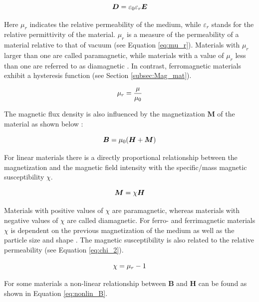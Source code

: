 \begin{equation}
\label{eq:D_tot}
\centering
\boldsymbol{D} = \varepsilon_{0}\varepsilon_{r}\boldsymbol{E}
\end{equation}

Here $\mu_{r}$ indicates the relative permeability of the medium, while $\varepsilon_{r}$ stands for the relative permittivity of the material. $\mu_{r}$ is a measure of the permeability of a material relative to that of vacuum (see Equation \ref{eq:mu_r}). Materials with $\mu_{r}$ larger than one are called paramagnetic, while materials with a value of $\mu_{r}$ less than one are referred to as diamagnetic \cite{svoboda2004magnetic}. In contrast, ferromagnetic materials exhibit a hysteresis function (see Section \ref{subsec:Mag_mat}).  

\begin{equation}
\label{eq:mu_r}
\centering
\mu_{r} = \frac{\mu}{\mu_{0}}
\end{equation}


The magnetic flux density is also influenced by the magnetization $\boldsymbol{M}$ of the material as shown below \cite{ichimura1989maxwell}: 

\begin{equation}
\label{eq:Mag}
\centering
\boldsymbol{B} = \mu_{0}(\boldsymbol{H} + \boldsymbol{M})
\end{equation}

For linear materials there is a directly proportional relationship between the magnetization and the magnetic field intensity with the specific/mass magnetic susceptibility $\chi$.  

\begin{equation}
\label{eq:chi}
\centering
\boldsymbol{M} = \chi\boldsymbol{H}
\end{equation}

Materials with positive values of $\chi$ are paramagnetic, whereas materials with negative values of $\chi$ are called diamagnetic. For ferro- and ferrimagnetic materials $\chi$ is dependent on the previous magnetization of the medium as well as the particle size and shape \cite{michalowsky2006magnettechnik}. The magnetic susceptibility is also related to the relative permeability (see Equation \ref{eq:chi_2}).

\begin{equation}
\label{eq:chi_2}
\centering
\chi = \mu_{r}-1
\end{equation}

For some materials a non-linear relationship between $\boldsymbol{B}$ and $\boldsymbol{H}$ can be found as shown in Equation \ref{eq:nonlin_B}.

